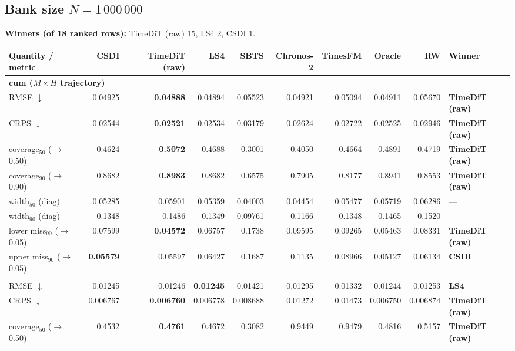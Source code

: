 \documentclass[11pt,a4paper]{article}
\begin{document}
\begin{landscape}
\section*{Bank size $N = 1\,000\,000$}
\noindent\textbf{Winners (of 18 ranked rows):} TimeDiT (raw) 15, LS4 2, CSDI 1.
\begin{center}\small
\begin{tabular}{lrrrrrrrrl}
\toprule
Quantity / metric & CSDI & TimeDiT (raw) & LS4 & SBTS & Chronos-2 & TimesFM & Oracle & RW & Winner \\
\midrule
\multicolumn{10}{l}{\textbf{cum ($M\times H$ trajectory)}} \\
RMSE $\downarrow$ & 0.04925 & \textbf{0.04888} & 0.04894 & 0.05523 & 0.04921 & 0.05094 & 0.04911 & 0.05670 & \textbf{TimeDiT (raw)} \\
CRPS $\downarrow$ & 0.02544 & \textbf{0.02521} & 0.02534 & 0.03179 & 0.02624 & 0.02722 & 0.02525 & 0.02946 & \textbf{TimeDiT (raw)} \\
coverage$_{50}$ ($\to$0.50) & 0.4624 & \textbf{0.5072} & 0.4688 & 0.3001 & 0.4050 & 0.4664 & 0.4891 & 0.4719 & \textbf{TimeDiT (raw)} \\
coverage$_{90}$ ($\to$0.90) & 0.8682 & \textbf{0.8983} & 0.8682 & 0.6575 & 0.7905 & 0.8177 & 0.8941 & 0.8553 & \textbf{TimeDiT (raw)} \\
width$_{50}$ (diag) & 0.05285 & 0.05901 & 0.05359 & 0.04003 & 0.04454 & 0.05477 & 0.05719 & 0.06286 & --- \\
width$_{90}$ (diag) & 0.1348 & 0.1486 & 0.1349 & 0.09761 & 0.1166 & 0.1348 & 0.1465 & 0.1520 & --- \\
lower miss$_{90}$ ($\to$0.05) & 0.07599 & \textbf{0.04572} & 0.06757 & 0.1738 & 0.09595 & 0.09265 & 0.05463 & 0.08331 & \textbf{TimeDiT (raw)} \\
upper miss$_{90}$ ($\to$0.05) & \textbf{0.05579} & 0.05597 & 0.06427 & 0.1687 & 0.1135 & 0.08966 & 0.05127 & 0.06134 & \textbf{CSDI} \\
\addlinespace
\multicolumn{10}{l}{\textbf{step ($M\times H$)}} \\
RMSE $\downarrow$ & 0.01245 & 0.01246 & \textbf{0.01245} & 0.01421 & 0.01295 & 0.01332 & 0.01244 & 0.01253 & \textbf{LS4} \\
CRPS $\downarrow$ & 0.006767 & \textbf{0.006760} & 0.006778 & 0.008688 & 0.01272 & 0.01473 & 0.006750 & 0.006874 & \textbf{TimeDiT (raw)} \\
coverage$_{50}$ ($\to$0.50) & 0.4532 & \textbf{0.4761} & 0.4672 & 0.3082 & 0.9449 & 0.9479 & 0.4816 & 0.5157 & \textbf{TimeDiT (raw)} \\

\end{tabular}
\end{center}
\end{landscape}
\end{document}
